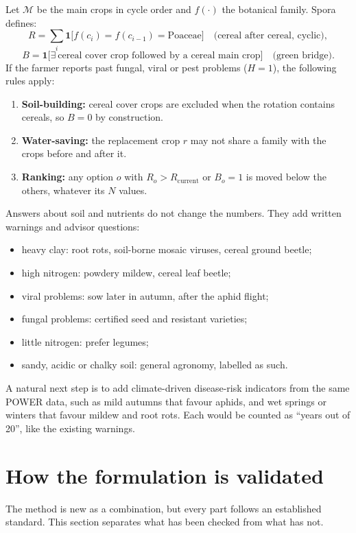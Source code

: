 \documentclass[11pt,a4paper]{article}
\begin{document}
Let $\mathcal{M}$ be the main crops in cycle order and $f(\cdot)$ the botanical family. Spora defines:
\[
R=\sum_{i}\mathbf{1}\bigl[f(c_i)=f(c_{i-1})=\text{Poaceae}\bigr] \quad\text{(cereal after cereal, cyclic)},
\]
\[
B=\mathbf{1}\bigl[\exists\ \text{cereal cover crop followed by a cereal main crop}\bigr]\quad\text{(green bridge)}.
\]
If the farmer reports past fungal, viral or pest problems ($H=1$), the following rules apply:
\begin{enumerate}
\item \textbf{Soil-building:} cereal cover crops are excluded when the rotation contains cereals, so $B=0$ by construction.
\item \textbf{Water-saving:} the replacement crop $r$ may not share a family with the crops before and after it.
\item \textbf{Ranking:} any option $o$ with $R_o>R_{\text{current}}$ or $B_o=1$ is moved below the others, whatever its $N$ values.
\end{enumerate}
Answers about soil and nutrients do not change the numbers. They add written warnings and advisor questions:
\begin{itemize}
\item heavy clay: root rots, soil-borne mosaic viruses, cereal ground beetle;
\item high nitrogen: powdery mildew, cereal leaf beetle;
\item viral problems: sow later in autumn, after the aphid flight;
\item fungal problems: certified seed and resistant varieties;
\item little nitrogen: prefer legumes;
\item sandy, acidic or chalky soil: general agronomy, labelled as such.
\end{itemize}

A natural next step is to add climate-driven disease-risk indicators from the same POWER data, such as mild
autumns that favour aphids, and wet springs or winters that favour mildew and root rots. Each would be counted
as ``years out of 20'', like the existing warnings.

\section{How the formulation is validated}
The method is new as a combination, but every part follows an established standard. This section separates what
has been checked from what has not.
\end{document}
